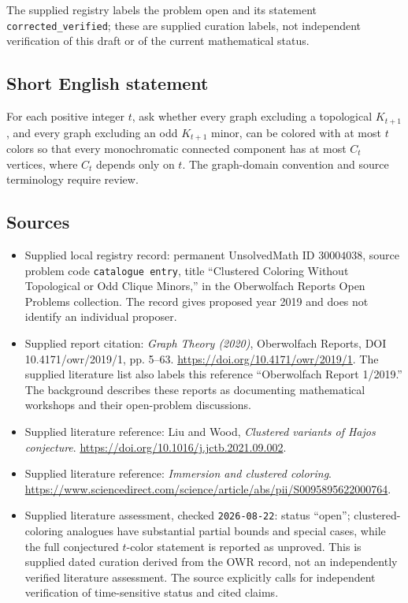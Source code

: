 \documentclass[11pt]{article}
\begin{document}
The supplied registry labels the problem open and its statement \texttt{corrected\_verified}; these are supplied curation labels, not independent verification of this draft or of the current mathematical status.
\subsection{Short English statement}
For each positive integer \(t\), ask whether every graph excluding a topological \(K_{t+1}\), and every graph excluding an odd \(K_{t+1}\) minor, can be colored with at most \(t\) colors so that every monochromatic connected component has at most \(C_t\) vertices, where \(C_t\) depends only on \(t\). The graph-domain convention and source terminology require review.
\subsection{Sources}
\begin{itemize}
\item Supplied local registry record: permanent UnsolvedMath ID \(30004038\), source problem code \texttt{catalogue entry}, title ``Clustered Coloring Without Topological or Odd Clique Minors,'' in the Oberwolfach Reports Open Problems collection. The record gives proposed year 2019 and does not identify an individual proposer.
\item Supplied report citation: \emph{Graph Theory (2020)}, Oberwolfach Reports, DOI 10.4171/owr/2019/1, pp. 5--63. \url{https://doi.org/10.4171/owr/2019/1}. The supplied literature list also labels this reference ``Oberwolfach Report 1/2019.'' The background describes these reports as documenting mathematical workshops and their open-problem discussions.
\item Supplied literature reference: Liu and Wood, \emph{Clustered variants of Hajos conjecture}. \url{https://doi.org/10.1016/j.jctb.2021.09.002}.
\item Supplied literature reference: \emph{Immersion and clustered coloring}. \url{https://www.sciencedirect.com/science/article/abs/pii/S0095895622000764}.
\item Supplied literature assessment, checked \texttt{2026-08-22}: status ``open''; clustered-coloring analogues have substantial partial bounds and special cases, while the full conjectured \(t\)-color statement is reported as unproved. This is supplied dated curation derived from the OWR record, not an independently verified literature assessment. The source explicitly calls for independent verification of time-sensitive status and cited claims.
\end{itemize}
\end{document}
